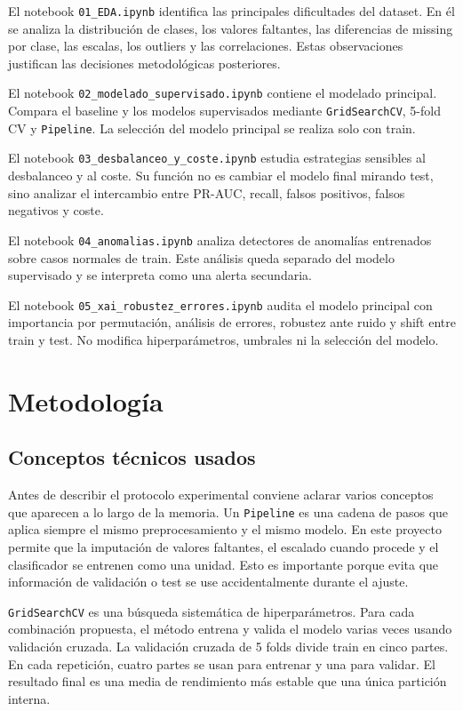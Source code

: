 \documentclass[11pt,a4paper]{article}
\begin{document}
El notebook \texttt{01\_EDA.ipynb} identifica las principales dificultades del dataset. En él se analiza la distribución de clases, los valores faltantes, las diferencias de missing por clase, las escalas, los outliers y las correlaciones. Estas observaciones justifican las decisiones metodológicas posteriores.

El notebook \texttt{02\_modelado\_\allowbreak supervisado.ipynb} contiene el modelado principal. Compara el baseline y los modelos supervisados mediante \texttt{GridSearchCV}, 5-fold CV y \texttt{Pipeline}. La selección del modelo principal se realiza solo con train.

El notebook \texttt{03\_desbalanceo\_\allowbreak y\_\allowbreak coste.ipynb} estudia estrategias sensibles al desbalanceo y al coste. Su función no es cambiar el modelo final mirando test, sino analizar el intercambio entre PR-AUC, recall, falsos positivos, falsos negativos y coste.

El notebook \texttt{04\_anomalias.ipynb} analiza detectores de anomalías entrenados sobre casos normales de train. Este análisis queda separado del modelo supervisado y se interpreta como una alerta secundaria.

El notebook \texttt{05\_xai\_\allowbreak robustez\_\allowbreak errores.ipynb} audita el modelo principal con importancia por permutación, análisis de errores, robustez ante ruido y shift entre train y test. No modifica hiperparámetros, umbrales ni la selección del modelo.

\section{Metodología}
\label{sec_metodologia}

\subsection{Conceptos técnicos usados}
\label{sec_conceptos}

Antes de describir el protocolo experimental conviene aclarar varios conceptos que aparecen a lo largo de la memoria. Un \texttt{Pipeline} es una cadena de pasos que aplica siempre el mismo preprocesamiento y el mismo modelo. En este proyecto permite que la imputación de valores faltantes, el escalado cuando procede y el clasificador se entrenen como una unidad. Esto es importante porque evita que información de validación o test se use accidentalmente durante el ajuste.

\texttt{GridSearchCV} es una búsqueda sistemática de hiperparámetros. Para cada combinación propuesta, el método entrena y valida el modelo varias veces usando validación cruzada. La validación cruzada de 5 folds divide train en cinco partes. En cada repetición, cuatro partes se usan para entrenar y una para validar. El resultado final es una media de rendimiento más estable que una única partición interna.
\end{document}
